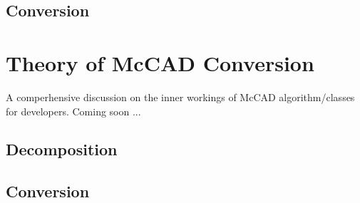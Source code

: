 \documentclass[12pt, a4paper, titlepage]{article}
\begin{document}
\subsection{Conversion}


\section{Theory of McCAD Conversion} \label{Theory of McCAD Conversion}
A comperhensive discussion on the inner workings of McCAD algorithm/classes for developers. Coming soon ...
\subsection{Decomposition}
\subsection{Conversion}
\newpage
%

\end{document}
